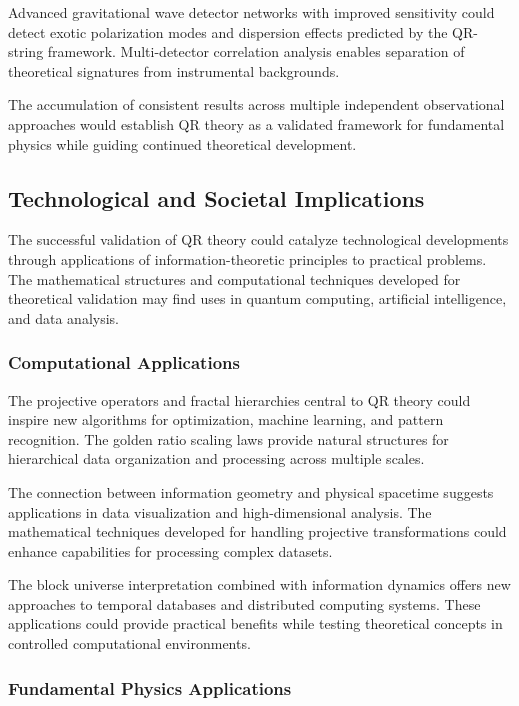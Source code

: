 Advanced gravitational wave detector networks with improved sensitivity could detect exotic polarization modes and dispersion effects predicted by the QR-string framework. Multi-detector correlation analysis enables separation of theoretical signatures from instrumental backgrounds.

The accumulation of consistent results across multiple independent observational approaches would establish QR theory as a validated framework for fundamental physics while guiding continued theoretical development.

\subsection{Technological and Societal Implications}
\label{subsec:technological-implications}

The successful validation of QR theory could catalyze technological developments through applications of information-theoretic principles to practical problems. The mathematical structures and computational techniques developed for theoretical validation may find uses in quantum computing, artificial intelligence, and data analysis.

\subsubsection{Computational Applications}
\label{subsubsec:computational-applications}

The projective operators and fractal hierarchies central to QR theory could inspire new algorithms for optimization, machine learning, and pattern recognition. The golden ratio scaling laws provide natural structures for hierarchical data organization and processing across multiple scales.

The connection between information geometry and physical spacetime suggests applications in data visualization and high-dimensional analysis. The mathematical techniques developed for handling projective transformations could enhance capabilities for processing complex datasets.

The block universe interpretation combined with information dynamics offers new approaches to temporal databases and distributed computing systems. These applications could provide practical benefits while testing theoretical concepts in controlled computational environments.

\subsubsection{Fundamental Physics Applications}
\label{subsubsec:physics-applications}

